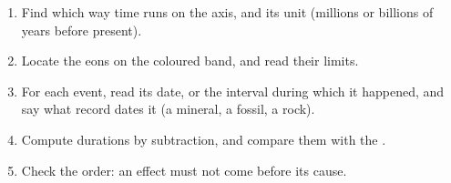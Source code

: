 \begin{method}\label{met:g12:early-earth:timeline}
\begin{enumerate}
  \item Find which way time runs on the axis, and its unit (millions or
        billions of years before present).
  \item Locate the eons on the coloured band, and read their limits.
  \item For each event, read its date, or the interval during which it
        happened, and say what record dates it (a mineral, a fossil, a rock).
  \item Compute durations by subtraction, and compare them with the .
  \item Check the order: an effect must not come before its cause.
\end{enumerate}
\end{method}

